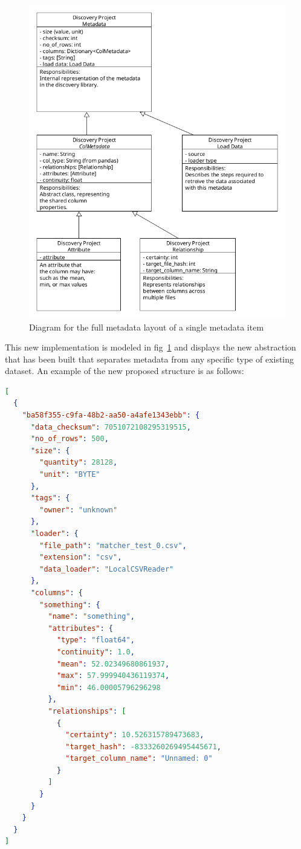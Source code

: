 \begin{figure}[h]
    \centering
    \includegraphics[width=12cm]{figures/metadata/metadata_v2}
    \caption{Diagram for the full metadata layout of a single metadata item}
    \label{fig:metadata_fig_3}
\end{figure}

This new implementation is modeled in fig~\ref{fig:metadata_fig_3} and displays the new abstraction that has been built
that separates metadata from any specific type of existing dataset.
An example of the new proposed structure is as follows:

\begin{lstlisting}[language=json,firstnumber=1,label={lst:lstlisting}]
[
  {
    "ba58f355-c9fa-48b2-aa50-a4afe1343ebb": {
      "data_checksum": 7051072108295319515,
      "no_of_rows": 500,
      "size": {
        "quantity": 28128,
        "unit": "BYTE"
      },
      "tags": {
        "owner": "unknown"
      },
      "loader": {
        "file_path": "matcher_test_0.csv",
        "extension": "csv",
        "data_loader": "LocalCSVReader"
      },
      "columns": {
        "something": {
          "name": "something",
          "attributes": {
            "type": "float64",
            "continuity": 1.0,
            "mean": 52.02349680861937,
            "max": 57.999940436119374,
            "min": 46.00005796296298
          },
          "relationships": [
            {
              "certainty": 10.526315789473683,
              "target_hash": -8333260269495445671,
              "target_column_name": "Unnamed: 0"
            }
          ]
        }
      }
    }
  }
]

\end{lstlisting}

